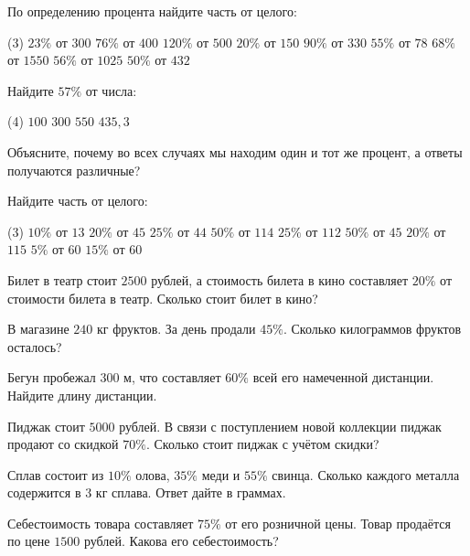 \begin{class}[number=5]
	\begin{listofex}
		\item По определению процента найдите часть от целого: 
		\begin{tasks}(3)
			\task \( 23\%  \) от \( 300 \) 
			\task \( 76\%  \) от \( 400 \)   
			\task \( 120\%  \) от \( 500 \)   
			\task \( 20\%  \) от \( 150 \)   
			\task \( 90\%  \) от \( 330 \)   
			\task \( 55\%  \) от \( 78 \)   
			\task \( 68\%  \) от \( 1550 \)   
			\task \( 56\%  \) от \( 1025 \)   
			\task \( 50\%  \) от \( 432\)   
		\end{tasks}
		\item Найдите \( 57\% \) от числа:\begin{tasks}(4)
			\task \( 100 \)
			\task \( 300 \)
			\task \( 550 \)
			\task \( 435,3 \)
		\end{tasks}
		Объясните, почему во всех случаях мы находим один и тот же процент, а ответы получаются
		различные?
		\item Найдите часть от целого: \begin{tasks}(3)
			\task \( 10\% \) от \( 13 \)
			\task \( 20\% \) от \( 45 \)
			\task \( 25\% \) от \( 44 \)
			\task \( 50\% \) от \( 114 \)
			\task \( 25\% \) от \( 112 \)
			\task \( 50\% \) от \( 45 \)
			\task \( 20\% \) от \( 115 \)
			\task \( 5\% \) от \( 60 \)
			\task \( 15\% \) от \( 60 \)
		\end{tasks} 
		\item Билет в театр стоит \( 2500 \) рублей, а стоимость билета в кино составляет \( 20\% \) от стоимости билета в театр. Сколько стоит билет в кино?
		\item В магазине \( 240  \) кг фруктов. За день продали \( 45\% \). Сколько килограммов фруктов осталось?
		\item Бегун пробежал  \( 300 \) м, что составляет \( 60\% \) всей его намеченной дистанции. Найдите длину дистанции.
		\item  Пиджак стоит \( 5000  \) рублей. В связи с поступлением новой коллекции пиджак продают со скидкой \( 70\% \). Сколько стоит пиджак с учётом скидки? 
		\item  Сплав состоит из \( 10\% \) олова, \( 35\% \) меди и \( 55\% \) свинца. Сколько каждого металла содержится в \( 3 \) кг сплава. Ответ дайте в граммах. 
		\item  Себестоимость товара составляет \( 75\% \) от его розничной цены. Товар продаётся по цене \( 1500 \) рублей. Какова его себестоимость?
		
	\end{listofex}
\end{class}

